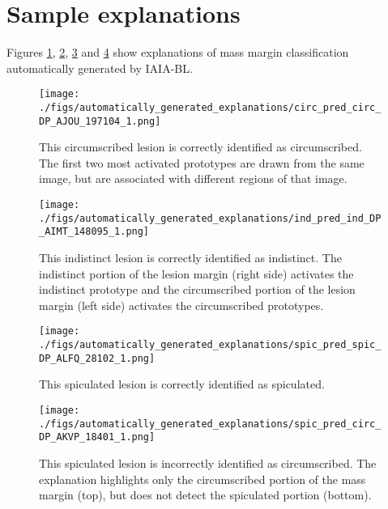 \documentclass[11pt]{article}
\begin{document}
\section{Sample explanations} \label{app:local_anas}
\FloatBarrier

Figures \ref{fig:auto_circ_p_circ}, \ref{fig:auto_ind_p_ind}, \ref{fig:auto_spic_p_spic_2} and \ref{fig:auto_spic_pred_circ} show explanations of mass margin classification automatically generated by IAIA-BL.

\begin{figure}[h]
        \begin{center}
            \texttt{[image: ./figs/automatically\_generated\_explanations/circ\_pred\_circ\_DP\_AJOU\_197104\_1.png]}
        \end{center}
        \vfill
           \caption{This circumscribed lesion is correctly identified as circumscribed. The first two most activated prototypes are drawn from the same image, but are associated with different regions of that image.}
        \label{fig:auto_circ_p_circ}
\end{figure}
\begin{figure}[h]
        \begin{center}
            \texttt{[image: ./figs/automatically\_generated\_explanations/ind\_pred\_ind\_DP\_AIMT\_148095\_1.png]}
        \end{center}
        \vfill
           \caption{This indistinct lesion is correctly identified as indistinct. The indistinct portion of the lesion margin (right side) activates the indistinct prototype and the circumscribed portion of the lesion margin (left side) activates the circumscribed prototypes.}
        \label{fig:auto_ind_p_ind}
\end{figure}
\begin{figure}[h]
        \begin{center}
            \texttt{[image: ./figs/automatically\_generated\_explanations/spic\_pred\_spic\_DP\_ALFQ\_28102\_1.png]}
        \end{center}
        \vfill
           \caption{This spiculated lesion is correctly identified as spiculated.}
        \label{fig:auto_spic_p_spic_2}
\end{figure}
\begin{figure}[h]
        \begin{center}
            \texttt{[image: ./figs/automatically\_generated\_explanations/spic\_pred\_circ\_DP\_AKVP\_18401\_1.png]}
        \end{center}
        \vfill
           \caption{This spiculated lesion is incorrectly identified as circumscribed. The explanation highlights only the circumscribed portion of the mass margin (top), but does not detect the spiculated portion (bottom).}
        \label{fig:auto_spic_pred_circ}
\end{figure}
\end{document}
